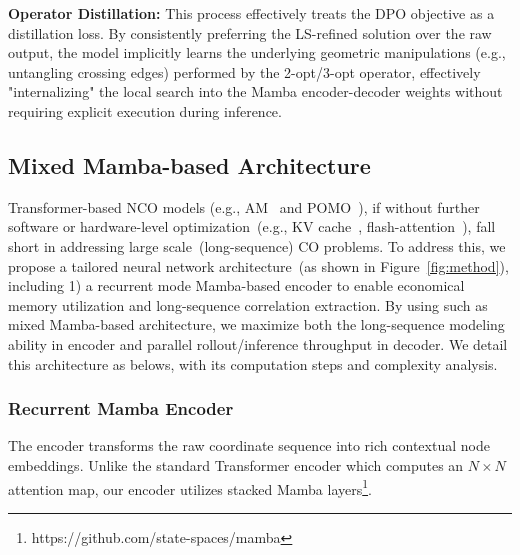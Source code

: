 \documentclass{article}
\theoremstyle{plain}
\theoremstyle{definition}
\theoremstyle{remark}
\begin{document}
\textbf{Operator Distillation:} This process effectively treats the DPO objective as a distillation loss. By consistently preferring the LS-refined solution over the raw output, the model implicitly learns the underlying geometric manipulations (e.g., untangling crossing edges) performed by the 2-opt/3-opt operator, effectively "internalizing" the local search into the Mamba encoder-decoder weights without requiring explicit execution during inference.


\subsection{Mixed Mamba-based Architecture}
Transformer-based NCO models (e.g., AM~\cite{3} and POMO~\cite{4}), if without further software or hardware-level optimization~(e.g., KV cache~\cite{kv-cache}, flash-attention~\cite{flashattention}), fall short in addressing large scale~(long-sequence) CO problems. To address this, we propose a tailored neural network architecture~(as shown in Figure~\ref{fig:method}), including 1) a recurrent mode Mamba-based encoder to enable economical memory utilization and long-sequence correlation extraction. By using such as mixed Mamba-based architecture, we maximize both the long-sequence modeling ability in encoder and parallel rollout/inference throughput in decoder. We detail this architecture as belows, with its computation steps and complexity analysis.

\subsubsection{Recurrent Mamba Encoder}

The encoder transforms the raw coordinate sequence into rich contextual node embeddings. Unlike the standard Transformer encoder which computes an $N \times N$ attention map, our encoder utilizes stacked Mamba layers\footnote{https://github.com/state-spaces/mamba}.
\end{document}
